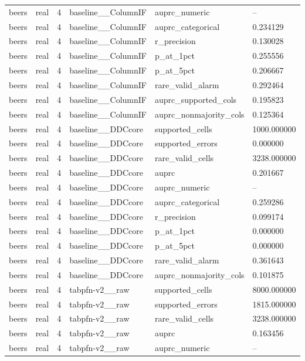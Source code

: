 \begin{tabular}{llllll}
beers & real & 4 & baseline\_\_ColumnIF & auprc\_numeric & -- \\
beers & real & 4 & baseline\_\_ColumnIF & auprc\_categorical & 0.234129 \\
beers & real & 4 & baseline\_\_ColumnIF & r\_precision & 0.130028 \\
beers & real & 4 & baseline\_\_ColumnIF & p\_at\_1pct & 0.255556 \\
beers & real & 4 & baseline\_\_ColumnIF & p\_at\_5pct & 0.206667 \\
beers & real & 4 & baseline\_\_ColumnIF & rare\_valid\_alarm & 0.292464 \\
beers & real & 4 & baseline\_\_ColumnIF & auprc\_supported\_cols & 0.195823 \\
beers & real & 4 & baseline\_\_ColumnIF & auprc\_nonmajority\_cols & 0.125364 \\
beers & real & 4 & baseline\_\_DDCcore & supported\_cells & 1000.000000 \\
beers & real & 4 & baseline\_\_DDCcore & supported\_errors & 0.000000 \\
beers & real & 4 & baseline\_\_DDCcore & rare\_valid\_cells & 3238.000000 \\
beers & real & 4 & baseline\_\_DDCcore & auprc & 0.201667 \\
beers & real & 4 & baseline\_\_DDCcore & auprc\_numeric & -- \\
beers & real & 4 & baseline\_\_DDCcore & auprc\_categorical & 0.259286 \\
beers & real & 4 & baseline\_\_DDCcore & r\_precision & 0.099174 \\
beers & real & 4 & baseline\_\_DDCcore & p\_at\_1pct & 0.000000 \\
beers & real & 4 & baseline\_\_DDCcore & p\_at\_5pct & 0.000000 \\
beers & real & 4 & baseline\_\_DDCcore & rare\_valid\_alarm & 0.361643 \\
beers & real & 4 & baseline\_\_DDCcore & auprc\_nonmajority\_cols & 0.101875 \\
beers & real & 4 & tabpfn-v2\_\_raw & supported\_cells & 8000.000000 \\
beers & real & 4 & tabpfn-v2\_\_raw & supported\_errors & 1815.000000 \\
beers & real & 4 & tabpfn-v2\_\_raw & rare\_valid\_cells & 3238.000000 \\
beers & real & 4 & tabpfn-v2\_\_raw & auprc & 0.163456 \\
beers & real & 4 & tabpfn-v2\_\_raw & auprc\_numeric & -- \\

\end{tabular}
